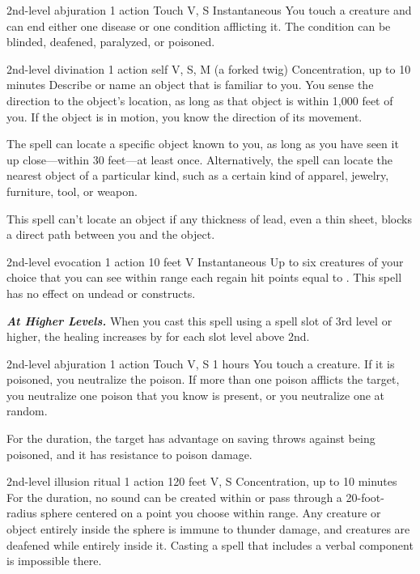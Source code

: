 \documentclass[10pt,twoside,twocolumn,openany]{book}
\newcommand{\castingModifier}{3}
\newcommand\impact[1]{
	\textbf{\textit{#1}}
}
\begin{document}
{2nd-level abjuration}
{\color{action}1 action}
{Touch}
{V, S}
{Instantaneous}
%
You touch a creature and can end either one disease or one condition afflicting it. The condition can be blinded, deafened, paralyzed, or poisoned.

{2nd-level divination}
{\color{action}1 action}
{self}
{V, S, M (a forked twig)}
{{\color{concentration}Concentration}, up to 10 minutes}
%
Describe or name an object that is familiar to you. You sense the direction to the object’s location, as long as that object is within 1,000 feet of you. If the object is in motion, you know the direction of its movement.

The spell can locate a specific object known to you, as long as you have seen it up close—within 30 feet—at least once. Alternatively, the spell can locate the nearest object of a particular kind, such as a certain kind of apparel, jewelry, furniture, tool, or weapon.

This spell can’t locate an object if any thickness of lead, even a thin sheet, blocks a direct path between you and the object.

{2nd-level evocation}
{\color{action}1 action}
{10 feet}
{V}
{Instantaneous}
%
Up to six creatures of your choice that you can see within range each regain hit points equal to \dice{2d8 + \castingModifier}. This spell has no effect on undead or constructs.

\impact{At Higher Levels.} When you cast this spell using a spell slot of 3rd level or higher, the healing increases by
 for each slot level above 2nd.

{2nd-level abjuration}
{\color{action}1 action}
{Touch}
{V, S}
{1 hours}
%
You touch a creature. If it is poisoned, you neutralize the poison. If more than one poison afflicts the target, you neutralize one poison that you know is present, or you neutralize one at random.

For the duration, the target has advantage on saving throws against being poisoned, and it has resistance to poison damage.

{2nd-level illusion {\color{ritual} ritual}}
{\color{action}1 action}
{120 feet}
{V, S}
{{\color{concentration}Concentration}, up to 10 minutes}
%
For the duration, no sound can be created within or pass through a 20-foot-radius sphere centered on a point you choose within range. Any creature or object entirely inside the sphere is immune to thunder damage, and creatures are deafened while entirely inside it. Casting a spell that includes a verbal component is impossible there.
\end{document}
